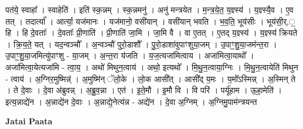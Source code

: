\documentclass[17pt]{extarticle}
\begin{document}
पत॑ये॒ स्वाहा᳚ । स्वाहेति॑ । इति॑ स्क॒न्नम् । स्क॒न्नमनु॑ । अनु॑ मन्त्रयेत । म॒न्त्र॒ये॒त॒ य॒ज्ञ्स्य॑ । य॒ज्ञ्स्यै॒व । ए॒व तत् । तदार्त्या᳚ । आर्त्या॒ यज॑मानः । यज॑मानो॒ वसी॑यान् । वसी॑यान् भवति । भ॒व॒ति॒ भूय॑सीः । भूय॑सी॒र्.॒ हि । हि दे॒वताः᳚ । दे॒वताः᳚ प्री॒णाति॑ । प्री॒णाति॑ जा॒मि । जा॒मि वै । वा ए॒तत् । ए॒तद् य॒ज्ञ्स्य॑ । य॒ज्ञ्स्य॑ क्रियते । क्रि॒य॒ते॒ यत् । यद॒न्वञ्चौ᳚ । अ॒न्वञ्चौ॑ पुरो॒डाशौ᳚ । पु॒रो॒डाशा॑वुपाꣳशुया॒जम् । उ॒पाꣳ॒॒शु॒या॒जम॑न्त॒रा । उ॒पाꣳ॒॒शु॒या॒जमित्यु॑पाꣳशु - या॒जम् । अ॒न्त॒रा य॑जति । य॒ज॒त्यजा॑मित्वाय । अजा॑मित्वा॒याथो᳚ । अजा॑मित्वा॒येत्यजा॑मि - त्वा॒य॒ । अथो॑ मिथुन॒त्वाय॑ । अथो॒ इत्यथो᳚ । मि॒थु॒न॒त्वाया॒ग्निः । मि॒थु॒न॒त्वायेति॑ मिथुन - त्वाय॑ । अ॒ग्निर॒मुष्मिन्न्॑ । अ॒मुष्मि॑न् ॅलो॒के । लो॒क आसी᳚त् । आसी᳚द् य॒मः । य॒मो᳚ऽस्मिन्न् । अ॒स्मिन् ते । ते दे॒वाः । दे॒वा अ॑ब्रुवन्न् । अ॒ब्रु॒व॒न्ना । एत॑ । इ॒ते॒मौ । इ॒मौ वि । वि परि॑ । पर्यू॑हाम । ऊ॒हा॒मेति॑ । इत्य॒न्नाद्ये॑न । अ॒न्नाद्ये॑न दे॒वाः । अ॒न्नाद्ये॒नेत्य॑न्न - अद्ये॑न । दे॒वा अ॒ग्निम् । अ॒ग्निमु॒पाम॑न्त्रयन्त \newline

\textbf{Jatai Paata} \newline
\end{document}

